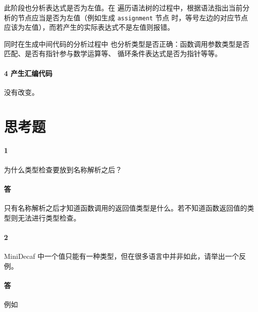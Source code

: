 \documentclass[UTF8]{ctexart}
\newcommand{\T}[1]{\texttt{{#1}}}
\begin{document}
            此阶段也分析表达式是否为左值。在
            遍历语法树的过程中，根据语法指出当前分析的节点应当是否为左值（例如生成 \T{assignment} 节点
            时，等号左边的对应节点应该为左值），而若产生的实际表达式不是左值则报错。

            同时在生成中间代码的分析过程中
            也分析类型是否正确：函数调用参数类型是否匹配、是否有指针参与数学运算等、
            循环条件表达式是否为指针等等。

            \paragraph{4 产生汇编代码} 没有改变。
        
    \section{思考题}
        \paragraph{1} 为什么类型检查要放到名称解析之后？
        \paragraph{答} 只有名称解析之后才知道函数调用的返回值类型是什么。若不知道函数返回值的类型则无法进行类型检查。
        \paragraph{2} MiniDecaf 中一个值只能有一种类型，但在很多语言中并非如此，请举出一个反例。
        \paragraph{答} 例如 
\end{document}
